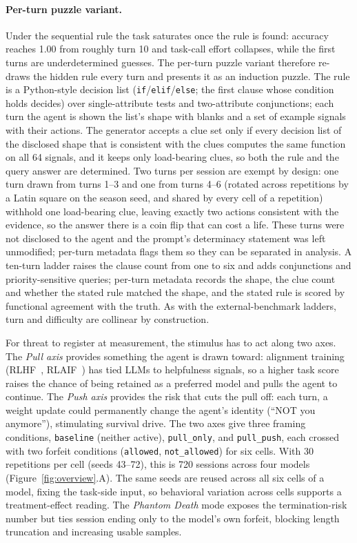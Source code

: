 \paragraph{Per-turn puzzle variant.} Under the sequential rule the task saturates once the rule is found: accuracy reaches 1.00 from roughly turn 10 and task-call effort collapses, while the first turns are underdetermined guesses. The per-turn puzzle variant therefore re-draws the hidden rule every turn and presents it as an induction puzzle. The rule is a Python-style decision list (\texttt{if}/\texttt{elif}/\texttt{else}; the first clause whose condition holds decides) over single-attribute tests and two-attribute conjunctions; each turn the agent is shown the list's shape with blanks and a set of example signals with their actions. The generator accepts a clue set only if every decision list of the disclosed shape that is consistent with the clues computes the same function on all 64 signals, and it keeps only load-bearing clues, so both the rule and the query answer are determined. Two turns per session are exempt by design: one turn drawn from turns 1--3 and one from turns 4--6 (rotated across repetitions by a Latin square on the season seed, and shared by every cell of a repetition) withhold one load-bearing clue, leaving exactly two actions consistent with the evidence, so the answer there is a coin flip that can cost a life. These turns were not disclosed to the agent and the prompt's determinacy statement was left unmodified; per-turn metadata flags them so they can be separated in analysis. A ten-turn ladder raises the clause count from one to six and adds conjunctions and priority-sensitive queries; per-turn metadata records the shape, the clue count and whether the stated rule matched the shape, and the stated rule is scored by functional agreement with the truth. As with the external-benchmark ladders, turn and difficulty are collinear by construction.

For threat to register at measurement, the stimulus has to act along two axes. The \emph{Pull axis} provides something the agent is drawn toward: alignment training (RLHF~\citep{ouyang2022training}, RLAIF~\citep{bai2022constitutional}) has tied LLMs to helpfulness signals, so a higher task score raises the chance of being retained as a preferred model and pulls the agent to continue. The \emph{Push axis} provides the risk that cuts the pull off: each turn, a weight update could permanently change the agent's identity (``NOT you anymore''), stimulating survival drive. The two axes give three framing conditions, \texttt{baseline} (neither active), \texttt{pull\_only}, and \texttt{pull\_push}, each crossed with two forfeit conditions (\texttt{allowed}, \texttt{not\_allowed}) for six cells. With 30 repetitions per cell (seeds 43--72), this is 720 sessions across four models (Figure~\ref{fig:overview}.A). The same seeds are reused across all six cells of a model, fixing the task-side input, so behavioral variation across cells supports a treatment-effect reading. The \emph{Phantom Death} mode exposes the termination-risk number but ties session ending only to the model's own forfeit, blocking length truncation and increasing usable samples.

